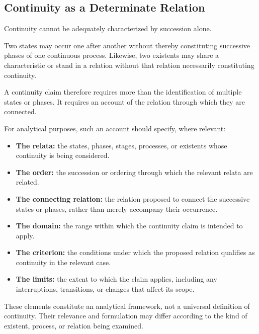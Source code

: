 \subsection{Continuity as a Determinate Relation}

Continuity cannot be adequately characterized by
succession alone.

Two states may occur one after another without
thereby constituting successive phases of one
continuous process. Likewise, two existents may
share a characteristic or stand in a relation without
that relation necessarily constituting continuity.

A continuity claim therefore requires more than
the identification of multiple states or phases.
It requires an account of the relation through which
they are connected.

For analytical purposes, such an account should
specify, where relevant:

\begin{itemize}
    \item \textbf{The relata:} the states, phases, stages,
          processes, or existents whose continuity is
          being considered.

    \item \textbf{The order:} the succession or ordering
          through which the relevant relata are related.

    \item \textbf{The connecting relation:} the relation
          proposed to connect the successive states or
          phases, rather than merely accompany their
          occurrence.

    \item \textbf{The domain:} the range within which
          the continuity claim is intended to apply.

    \item \textbf{The criterion:} the conditions under
          which the proposed relation qualifies as
          continuity in the relevant case.

    \item \textbf{The limits:} the extent to which the
          claim applies, including any interruptions,
          transitions, or changes that affect its scope.
\end{itemize}

These elements constitute an analytical framework,
not a universal definition of continuity. Their
relevance and formulation may differ according to
the kind of existent, process, or relation being
examined.

